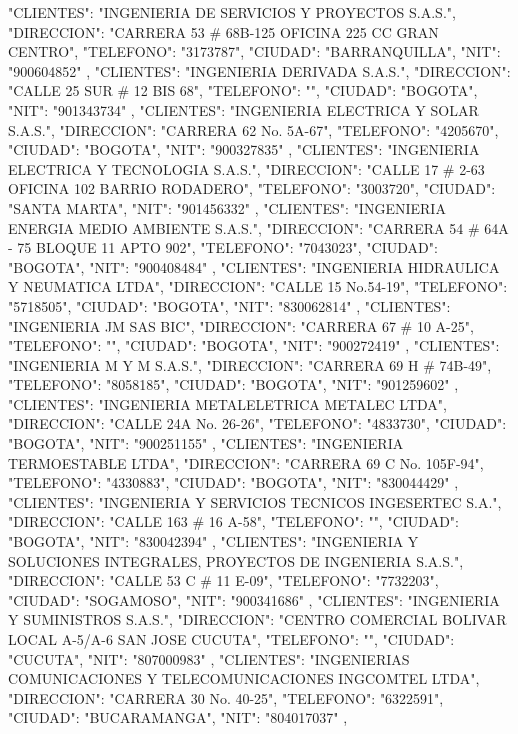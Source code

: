    {
   "CLIENTES": "INGENIERIA DE SERVICIOS Y PROYECTOS S.A.S.",
   "DIRECCION": "CARRERA 53 # 68B-125 OFICINA 225 CC GRAN CENTRO",
   "TELEFONO": "3173787",
   "CIUDAD": "BARRANQUILLA",
   "NIT": "900604852"
   },
   {
   "CLIENTES": "INGENIERIA DERIVADA S.A.S.",
   "DIRECCION": "CALLE 25 SUR # 12 BIS 68",
   "TELEFONO": "",
   "CIUDAD": "BOGOTA",
   "NIT": "901343734"
   },
   {
   "CLIENTES": "INGENIERIA ELECTRICA Y SOLAR S.A.S.",
   "DIRECCION": "CARRERA 62 No. 5A-67",
   "TELEFONO": "4205670",
   "CIUDAD": "BOGOTA",
   "NIT": "900327835"
   },
   {
   "CLIENTES": "INGENIERIA ELECTRICA Y TECNOLOGIA S.A.S.",
   "DIRECCION": "CALLE 17 # 2-63 OFICINA 102 BARRIO RODADERO",
   "TELEFONO": "3003720",
   "CIUDAD": "SANTA MARTA",
   "NIT": "901456332"
   },
   {
   "CLIENTES": "INGENIERIA ENERGIA MEDIO AMBIENTE S.A.S.",
   "DIRECCION": "CARRERA 54 # 64A - 75 BLOQUE 11 APTO 902",
   "TELEFONO": "7043023",
   "CIUDAD": "BOGOTA",
   "NIT": "900408484"
   },
   {
   "CLIENTES": "INGENIERIA HIDRAULICA Y NEUMATICA LTDA",
   "DIRECCION": "CALLE 15 No.54-19",
   "TELEFONO": "5718505",
   "CIUDAD": "BOGOTA",
   "NIT": "830062814"
   },
   {
   "CLIENTES": "INGENIERIA JM SAS BIC",
   "DIRECCION": "CARRERA 67 # 10 A-25",
   "TELEFONO": "",
   "CIUDAD": "BOGOTA",
   "NIT": "900272419"
   },
   {
   "CLIENTES": "INGENIERIA M Y M S.A.S.",
   "DIRECCION": "CARRERA 69 H # 74B-49",
   "TELEFONO": "8058185",
   "CIUDAD": "BOGOTA",
   "NIT": "901259602"
   },
   {
   "CLIENTES": "INGENIERIA METALELETRICA METALEC LTDA",
   "DIRECCION": "CALLE 24A No. 26-26",
   "TELEFONO": "4833730",
   "CIUDAD": "BOGOTA",
   "NIT": "900251155"
   },
   {
   "CLIENTES": "INGENIERIA TERMOESTABLE LTDA",
   "DIRECCION": "CARRERA 69 C No. 105F-94",
   "TELEFONO": "4330883",
   "CIUDAD": "BOGOTA",
   "NIT": "830044429"
   },
   {
   "CLIENTES": "INGENIERIA Y SERVICIOS TECNICOS INGESERTEC S.A.",
   "DIRECCION": "CALLE 163 # 16 A-58",
   "TELEFONO": "",
   "CIUDAD": "BOGOTA",
   "NIT": "830042394"
   },
   {
   "CLIENTES": "INGENIERIA Y SOLUCIONES INTEGRALES, PROYECTOS DE INGENIERIA S.A.S.",
   "DIRECCION": "CALLE 53 C # 11 E-09",
   "TELEFONO": "7732203",
   "CIUDAD": "SOGAMOSO",
   "NIT": "900341686"
   },
   {
   "CLIENTES": "INGENIERIA Y SUMINISTROS S.A.S.",
   "DIRECCION": "CENTRO COMERCIAL BOLIVAR LOCAL A-5/A-6 SAN JOSE CUCUTA",
   "TELEFONO": "",
   "CIUDAD": "CUCUTA",
   "NIT": "807000983"
   },
   {
   "CLIENTES": "INGENIERIAS COMUNICACIONES Y TELECOMUNICACIONES INGCOMTEL LTDA",
   "DIRECCION": "CARRERA 30 No. 40-25",
   "TELEFONO": "6322591",
   "CIUDAD": "BUCARAMANGA",
   "NIT": "804017037"
   },
